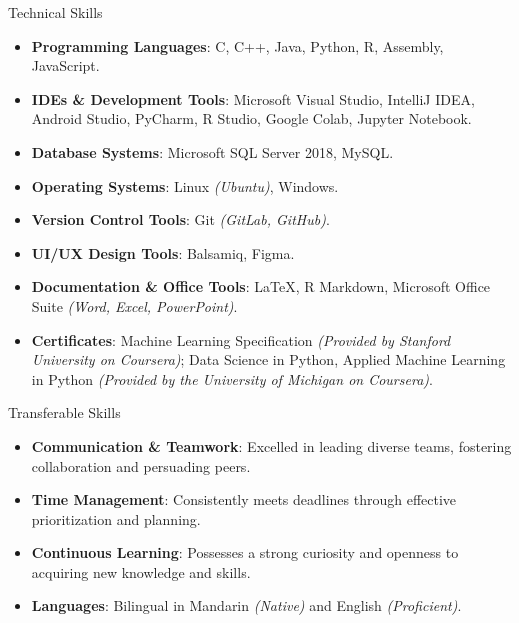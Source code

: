 \documentclass{resume} %
\begin{document}
\begin{rSection}{Technical Skills}
\begin{itemize}
    \item \textbf{Programming Languages}:  C, C++, Java, Python, R, Assembly, JavaScript.
    \vspace{-0.2cm}\item \textbf{IDEs \& Development Tools}: Microsoft Visual Studio, IntelliJ IDEA, Android Studio, PyCharm, R Studio, Google Colab, Jupyter Notebook.
    \vspace{-0.2cm}\item \textbf{Database Systems}: Microsoft SQL Server 2018, MySQL.
    \vspace{-0.2cm}\item \textbf{Operating Systems}: Linux \textit{(Ubuntu)}, Windows.
    \vspace{-0.2cm}\item \textbf{Version Control Tools}: Git \textit{(GitLab, GitHub)}.
    \vspace{-0.2cm}\item \textbf{UI/UX Design Tools}: Balsamiq, Figma.
    \vspace{-0.2cm}\item \textbf{Documentation \& Office Tools}: \LaTeX, R Markdown, Microsoft Office Suite \textit{(Word, Excel, PowerPoint)}.
    \vspace{-0.2cm}\item \textbf{Certificates}: Machine Learning Specification \textit{(Provided by Stanford University on Coursera)}; Data Science in Python, Applied Machine Learning in Python \textit{(Provided by the University of Michigan on Coursera)}.
\end{itemize}

\end{rSection}

\begin{rSection}{Transferable Skills}
\begin{itemize}
    \item \textbf{Communication \& Teamwork}: Excelled in leading diverse teams, fostering collaboration and persuading peers.
    \vspace{-0.2cm} \item \textbf{Time Management}: Consistently meets deadlines through effective prioritization and planning.
    \vspace{-0.2cm} \item \textbf{Continuous Learning}: Possesses a strong curiosity and openness to acquiring new knowledge and skills.
    \vspace{-0.2cm} \item \textbf{Languages}: Bilingual in Mandarin \textit{(Native)} and English \textit{(Proficient)}.
\end{itemize}
\end{rSection}
\end{document}
